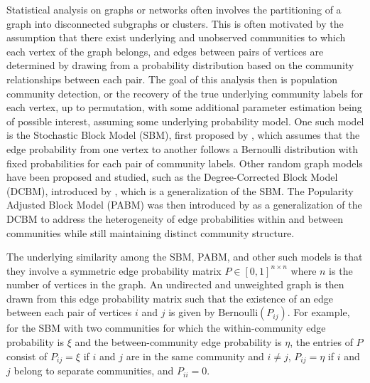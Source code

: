 \documentclass[12pt]{article}
\begin{document}
Statistical analysis on graphs or networks often involves the
partitioning of a graph into disconnected subgraphs or clusters. This is
often motivated by the assumption that there exist underlying and
unobserved communities to which each vertex of the graph belongs, and
edges between pairs of vertices are determined by drawing from a
probability distribution based on the community relationships between
each pair. The goal of this analysis then is population community
detection, or the recovery of the true underlying community labels for
each vertex, up to permutation, with some additional parameter
estimation being of possible interest, assuming some underlying
probability model. One such model is the Stochastic Block Model (SBM),
first proposed by \citet{doi:10.1080/0022250X.1971.9989788}, which
assumes that the edge probability from one vertex to another follows a
Bernoulli distribution with fixed probabilities for each pair of
community labels. Other random graph models have been proposed and
studied, such as the Degree-Corrected Block Model (DCBM), introduced by
\citet{Karrer_2011}, which is a generalization of the SBM. The
Popularity Adjusted Block Model (PABM) was then introduced by
\citet*{307cbeb9b1be48299388437423d94bf1} as a generalization of the
DCBM to address the heterogeneity of edge probabilities within and
between communities while still maintaining distinct community
structure.

The underlying similarity among the SBM, PABM, and other such models is
that they involve a symmetric edge probability matrix
\(P \in [0, 1]^{n \times n}\) where \(n\) is the number of vertices in
the graph. An undirected and unweighted graph is then drawn from this
edge probability matrix such that the existence of an edge between each
pair of vertices \(i\) and \(j\) is given by
\(\text{Bernoulli}(P_{ij})\). For example, for the SBM with two
communities for which the within-community edge probability is \(\xi\)
and the between-community edge probability is \(\eta\), the entries of
\(P\) consist of \(P_{ij} = \xi\) if \(i\) and \(j\) are in the same
community and \(i \neq j\), \(P_{ij} = \eta\) if \(i\) and \(j\) belong
to separate communities, and \(P_{ii} = 0\).
\end{document}
